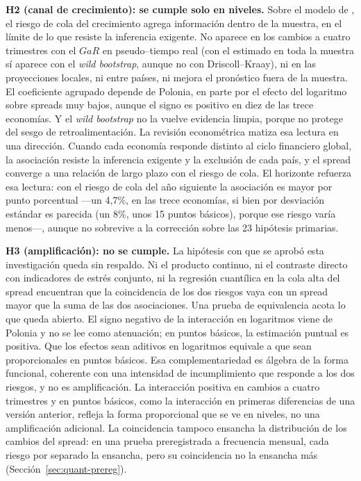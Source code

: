 \textbf{H2 (canal de crecimiento): se cumple solo en niveles.} Sobre el modelo de \citet{Chari2024b}, el riesgo de cola del crecimiento agrega información dentro de la muestra, en el límite de lo que resiste la inferencia exigente. No aparece en los cambios a cuatro trimestres con el $GaR$ en pseudo--tiempo real (con el estimado en toda la muestra sí aparece con el \textit{wild bootstrap}, aunque no con Driscoll--Kraay), ni en las proyecciones locales, ni entre países, ni mejora el pronóstico fuera de la muestra. El coeficiente agrupado depende de Polonia, en parte por el efecto del logaritmo sobre spreads muy bajos, aunque el signo es positivo en diez de las trece economías. Y el \textit{wild bootstrap} no la vuelve evidencia limpia, porque no protege del sesgo de retroalimentación. La revisión econométrica matiza esa lectura en una dirección. Cuando cada economía responde distinto al ciclo financiero global, la asociación resiste la inferencia exigente y la exclusión de cada país, y el spread converge a una relación de largo plazo con el riesgo de cola. El horizonte refuerza esa lectura: con el riesgo de cola del año siguiente la asociación es mayor por punto porcentual ---un 4,7\%, en las trece economías, si bien por desviación estándar es parecida (un 8\%, unos 15 puntos básicos), porque ese riesgo varía menos---, aunque no sobrevive a la corrección sobre las 23 hipótesis primarias.

\textbf{H3 (amplificación): no se cumple.} La hipótesis con que se aprobó esta investigación queda sin respaldo. Ni el producto continuo, ni el contraste directo con indicadores de estrés conjunto, ni la regresión cuantílica en la cola alta del spread encuentran que la coincidencia de los dos riesgos vaya con un spread mayor que la suma de las dos asociaciones. Una prueba de equivalencia acota lo que queda abierto. El signo negativo de la interacción en logaritmos viene de Polonia y no se lee como atenuación; en puntos básicos, la estimación puntual es positiva. Que los efectos sean aditivos en logaritmos equivale a que sean proporcionales en puntos básicos. Esa complementariedad es álgebra de la forma funcional, coherente con una intensidad de incumplimiento que responde a los dos riesgos, y no es amplificación. La interacción positiva en cambios a cuatro trimestres y en puntos básicos, como la interacción en primeras diferencias de una versión anterior, refleja la forma proporcional que se ve en niveles, no una amplificación adicional. La coincidencia tampoco ensancha la distribución de los cambios del spread: en una prueba preregistrada a frecuencia mensual, cada riesgo por separado la ensancha, pero su coincidencia no la ensancha más (Sección~\ref{sec:quant-prereg}).


